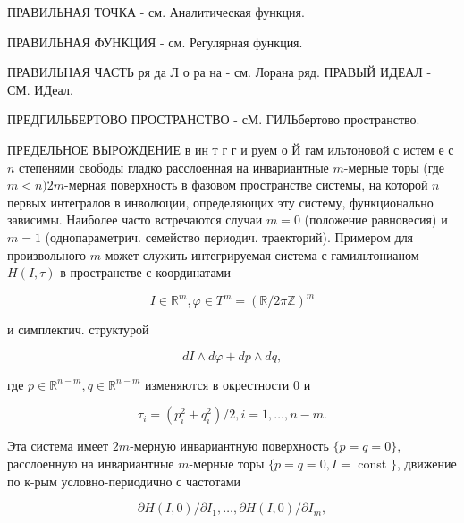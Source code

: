 \documentclass[10pt]{article}
\begin{document}
ПРАВИЛЬНАЯ ТОЧКА - см. Аналитическая функция.



ПРАВИЛЬНАЯ ФУНКЦИЯ - см. Регулярная функция.



ПРАВИЛЬНАЯ ЧАСТЬ ря да Л о ра на - см. Лорана ряд. ПРАВЫЙ ИДЕАЛ - СМ. ИДеал.



ПРЕДГИЛЬБЕРТОВО ПРОСТРАНСТВО - сМ. ГИЛЬбертово пространство.



ПРЕДЕЛЬНОЕ ВЫРОЖДЕНИЕ в ин т г г и руем о Й гам ильтоновой с истем е с $n$ степенями свободы гладко расслоенная на инвариантные $m$-мерные торы (где $m<n) 2 m$-мерная поверхность в фазовом пространстве системы, на которой $n$ первых интегралов в инволюции, определяющих эту систему, функционально зависимы. Наиболее часто встречаются случаи $m=0$ (положение равновесия) и $m=1$ (однопараметрич. семейство периодич. траекторий). Примером для произвольного $m$ может служить интегрируемая система с гамильтонианом $H(I, \tau)$ в пространстве с координатами



\[

I \in \mathbb{R}^{m}, \varphi \in T^{m}=(\mathbb{R} / 2 \pi \mathbb{Z})^{m}

\]



и симплектич. структурой



\[

d I \wedge d \varphi+d p \wedge d q,

\]



где $p \in \mathbb{R}^{n-m}, q \in \mathbb{R}^{n-m}$ изменяются в окрестности 0 и



\[

\tau_{i}=\left(p_{i}^{2}+q_{i}^{2}\right) / 2, i=1, \ldots, n-m .

\]



Эта система имеет $2 m$-мерную инвариантную поверхность $\{p=q=0\}$, расслоенную на инвариантные $m$-мерные торы $\{p=q=0, I=$ const $\}$, движение по к-рым условно-периодично с частотами



\[

\partial H(I, 0) / \partial I_{1}, \ldots, \partial H(I, 0) / \partial I_{m},

\]
\end{document}

